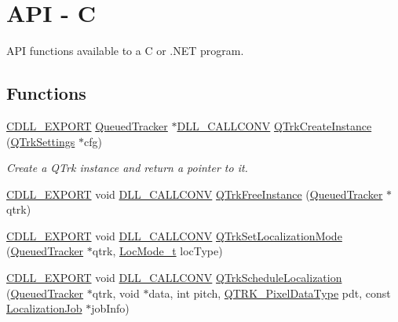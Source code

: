 \hypertarget{group__c__api}{}\section{A\+PI -\/ C}
\label{group__c__api}


A\+PI functions available to a C or .N\+ET program.  


\subsection*{Functions}
\begin{DoxyCompactItemize}
\item 
\hyperlink{dllmacros_8h_af97e4004759ff877db017c3d1a855482}{C\+D\+L\+L\+\_\+\+E\+X\+P\+O\+RT} \hyperlink{class_queued_tracker}{Queued\+Tracker} $\ast$\hyperlink{dllmacros_8h_a6596c37c55424b395798708344d63791}{D\+L\+L\+\_\+\+C\+A\+L\+L\+C\+O\+NV} \hyperlink{group__c__api_ga6f577c7b65dcdcb107ccdd7bb1f8883f}{Q\+Trk\+Create\+Instance} (\hyperlink{struct_q_trk_settings}{Q\+Trk\+Settings} $\ast$cfg)
\begin{DoxyCompactList}\small\item\em Create a Q\+Trk instance and return a pointer to it. \end{DoxyCompactList}\item 
\hyperlink{dllmacros_8h_af97e4004759ff877db017c3d1a855482}{C\+D\+L\+L\+\_\+\+E\+X\+P\+O\+RT} void \hyperlink{dllmacros_8h_a6596c37c55424b395798708344d63791}{D\+L\+L\+\_\+\+C\+A\+L\+L\+C\+O\+NV} \hyperlink{group__c__api_ga4262000013c06b69780a3e24c1d6e5b4}{Q\+Trk\+Free\+Instance} (\hyperlink{class_queued_tracker}{Queued\+Tracker} $\ast$qtrk)
\item 
\hyperlink{dllmacros_8h_af97e4004759ff877db017c3d1a855482}{C\+D\+L\+L\+\_\+\+E\+X\+P\+O\+RT} void \hyperlink{dllmacros_8h_a6596c37c55424b395798708344d63791}{D\+L\+L\+\_\+\+C\+A\+L\+L\+C\+O\+NV} \hyperlink{group__c__api_ga4f179d9a21e4d0878fb0b7b93d2ca758}{Q\+Trk\+Set\+Localization\+Mode} (\hyperlink{class_queued_tracker}{Queued\+Tracker} $\ast$qtrk, \hyperlink{qtrk__c__api_8h_a6ba72ec1daa19642f85a47defe8f0812}{Loc\+Mode\+\_\+t} loc\+Type)
\item 
\hyperlink{dllmacros_8h_af97e4004759ff877db017c3d1a855482}{C\+D\+L\+L\+\_\+\+E\+X\+P\+O\+RT} void \hyperlink{dllmacros_8h_a6596c37c55424b395798708344d63791}{D\+L\+L\+\_\+\+C\+A\+L\+L\+C\+O\+NV} \hyperlink{group__c__api_gacbe5d60ebb4af5dc16a061e94ed321ab}{Q\+Trk\+Schedule\+Localization} (\hyperlink{class_queued_tracker}{Queued\+Tracker} $\ast$qtrk, void $\ast$data, int pitch, \hyperlink{qtrk__c__api_8h_aad82367b3ea592a142bb50a2fb538b0b}{Q\+T\+R\+K\+\_\+\+Pixel\+Data\+Type} pdt, const \hyperlink{struct_localization_job}{Localization\+Job} $\ast$job\+Info)

\end{DoxyCompactItemize}

